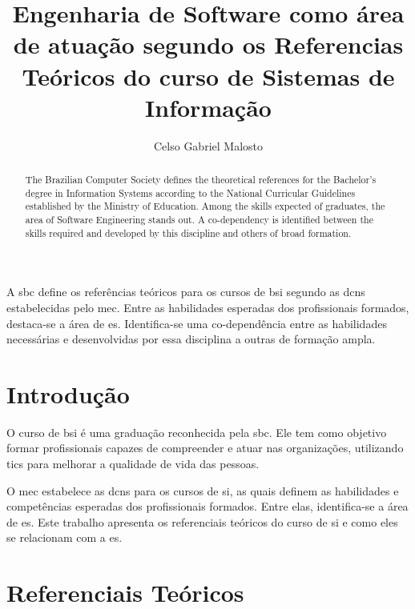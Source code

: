 \documentclass[12pt]{article}
\title{Engenharia de Software como área de atuação segundo os Referencias Teóricos do curso de Sistemas de Informação}
\author{Celso Gabriel Malosto\inst{1}}
\begin{document}
\maketitle

\begin{abstract}

    The Brazilian Computer Society defines the theoretical references for the Bachelor's degree in Information Systems according to the National Curricular Guidelines established by the Ministry of Education.
    Among the skills expected of graduates, the area of Software Engineering stands out.
    A co-dependency is identified between the skills required and developed by this discipline and others of broad formation.

\end{abstract}

\begin{resumo}

    A \acrshort{sbc} define os referências teóricos para os cursos de \acrlong{bsi} segundo as \acrshort{dcn}s estabelecidas pelo \acrshort{mec}.
    Entre as habilidades esperadas dos profissionais formados, destaca-se a área de \acrlong{es}.
    Identifica-se uma co-dependência entre as habilidades necessárias e desenvolvidas por essa disciplina a outras de formação ampla.

\end{resumo}

\section{Introdução}%
\label{sec:introducao}

O curso de \gls{bsi} é uma graduação reconhecida pela \gls{sbc}.
Ele tem como objetivo formar profissionais capazes de compreender e atuar nas organizações, utilizando \glspl{tic} para melhorar a qualidade de vida das pessoas.

O \gls{mec} estabelece as \glspl{dcn} para os cursos de \gls{si}, as quais definem as habilidades e competências esperadas dos profissionais formados.
Entre elas, identifica-se a área de \acrfull{es}.
Este trabalho apresenta os referenciais teóricos do curso de \gls{si} e como eles se relacionam com a \gls{es}.

\section{Referenciais Teóricos}%
\label{sec:referenciais_teoricos}
\end{document}
